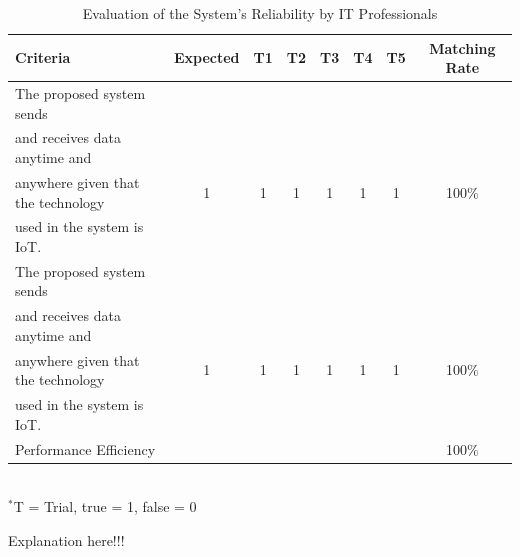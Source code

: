 \begin{table}[h!]
\caption{Evaluation of the System’s Reliability by IT Professionals}
\vspace{-1em}
\begin{center}
\fontsize{10}{12}\selectfont
\begin{tabular}{|| l c c c c c c c ||} 
 \hline
 Criteria & Expected & T1 & T2 & T3 & T4 & T5 & Matching Rate \\ [0.5ex] 
 \hline\hline
The proposed system sends &  &  &  &  &  &  &  \\
and receives data anytime and &  &  &  &  &  &  &  \\
anywhere given that the technology & 1 & 1 & 1 & 1 & 1 & 1 & 100\% \\
used in the system is IoT. &  &  &  &  &  &  &  \\ 
\hline
The proposed system sends &  &  &  &  &  &  &  \\
and receives data anytime and &  &  &  &  &  &  &  \\
anywhere given that the technology & 1 & 1 & 1 & 1 & 1 & 1 & 100\% \\
used in the system is IoT. &  &  &  &  &  &  &  \\ 
\hline
Performance Efficiency &  &  &  &  &  &  & 100\% \\ 
\hline
\end{tabular} \\
\footnotesize{\hspace{-10cm}$^*$T = Trial, true = 1, false = 0}
\end{center}
\end{table} 

Explanation here!!! \lipsum[1] \\




